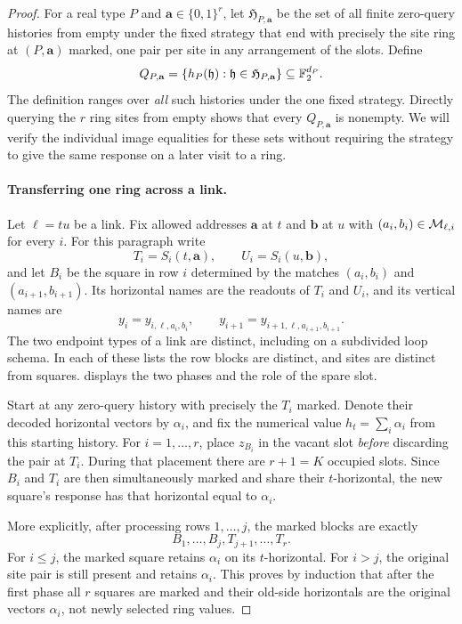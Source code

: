 \begin{proof}
For a real type $P$ and $\mathbf a\in\{0,1\}^r$, let
$\mathfrak H_{P,\mathbf a}$ be the set of all finite zero-query histories
from empty under the fixed strategy that end with precisely the site ring
at $(P,\mathbf a)$ marked, one pair per site in any arrangement of the
slots.  Define
\begin{equation}
\label{uniform:attained-sets}
 Q_{P,\mathbf a}
 =\{h_P(\mathfrak h):\mathfrak h\in\mathfrak H_{P,\mathbf a}\}
 \subseteq\mathbb F_2^{d_P}.
\end{equation}
The definition ranges over \emph{all} such histories under the one fixed
strategy.  Directly querying the $r$ ring sites from empty shows that
every $Q_{P,\mathbf a}$ is nonempty.  We will verify the individual image
equalities for these sets without requiring the strategy to give the same
response on a later visit to a ring.

\paragraph{Transferring one ring across a link.}
Let $\ell=tu$ be a link.  Fix allowed addresses $\mathbf a$ at $t$ and
$\mathbf b$ at $u$ with
$(a_i,b_i)\in\mathcal M_{\ell,i}$ for every $i$.  For this paragraph write
\[
 T_i=S_i(t,\mathbf a),\qquad U_i=S_i(u,\mathbf b),
\]
and let $B_i$ be the square in row $i$ determined by the matches
$(a_i,b_i)$ and $(a_{i+1},b_{i+1})$.  Its horizontal names are the readouts
of $T_i$ and $U_i$, and its vertical names are
\[
 y_i=y_{i,\ell,a_i,b_i},\qquad
 y_{i+1}=y_{i+1,\ell,a_{i+1},b_{i+1}}.
\]
The two endpoint types of a link are distinct, including on a subdivided
loop schema.  In each of these lists the row blocks are distinct, and sites
are distinct from squares.
 displays the two phases and the role of
the spare slot.

Start at any zero-query history with precisely the $T_i$ marked.  Denote
their decoded horizontal vectors by $\alpha_i$, and fix the numerical
value $h_t=\sum_i\alpha_i$ from this starting history.  For
$i=1,\ldots,r$, place $z_{B_i}$ in the vacant slot \emph{before}
discarding the pair at $T_i$.  During that placement there are $r+1=K$
occupied slots.  Since $B_i$ and $T_i$ are then simultaneously marked and
share their $t$-horizontal, the new square's response has that horizontal
equal to $\alpha_i$.

More explicitly, after processing rows $1,\ldots,j$, the marked blocks are
exactly
\[
 B_1,\ldots,B_j,T_{j+1},\ldots,T_r.
\]
For $i\leq j$, the marked square retains $\alpha_i$ on its
$t$-horizontal.  For $i>j$, the original site pair is still present and
retains $\alpha_i$.  This proves by induction that after the first phase
all $r$ squares are marked and their old-side horizontals are the original
vectors $\alpha_i$, not newly selected ring values.


\end{proof}
